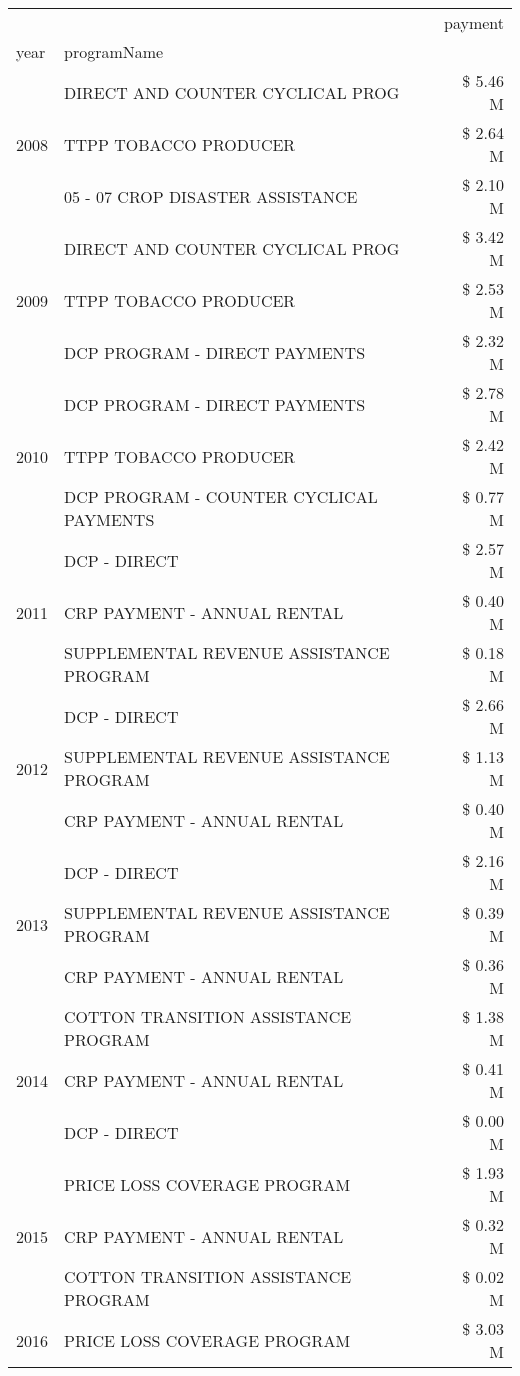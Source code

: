 \begin{tabular}{llr}
\toprule
 &  & payment \\
year & programName &  \\
\midrule
\multirow[t]{3}{*}{2008} & DIRECT AND COUNTER CYCLICAL PROG & \$ 5.46 M \\
 & TTPP TOBACCO PRODUCER & \$ 2.64 M \\
 & 05 - 07 CROP DISASTER ASSISTANCE & \$ 2.10 M \\
\cline{1-3}
\multirow[t]{3}{*}{2009} & DIRECT AND COUNTER CYCLICAL PROG & \$ 3.42 M \\
 & TTPP TOBACCO PRODUCER & \$ 2.53 M \\
 & DCP PROGRAM - DIRECT PAYMENTS & \$ 2.32 M \\
\cline{1-3}
\multirow[t]{3}{*}{2010} & DCP PROGRAM - DIRECT PAYMENTS & \$ 2.78 M \\
 & TTPP TOBACCO PRODUCER & \$ 2.42 M \\
 & DCP PROGRAM - COUNTER CYCLICAL PAYMENTS & \$ 0.77 M \\
\cline{1-3}
\multirow[t]{3}{*}{2011} & DCP - DIRECT & \$ 2.57 M \\
 & CRP PAYMENT - ANNUAL RENTAL & \$ 0.40 M \\
 & SUPPLEMENTAL REVENUE ASSISTANCE PROGRAM & \$ 0.18 M \\
\cline{1-3}
\multirow[t]{3}{*}{2012} & DCP - DIRECT & \$ 2.66 M \\
 & SUPPLEMENTAL REVENUE ASSISTANCE PROGRAM & \$ 1.13 M \\
 & CRP PAYMENT - ANNUAL RENTAL & \$ 0.40 M \\
\cline{1-3}
\multirow[t]{3}{*}{2013} & DCP - DIRECT & \$ 2.16 M \\
 & SUPPLEMENTAL REVENUE ASSISTANCE PROGRAM & \$ 0.39 M \\
 & CRP PAYMENT - ANNUAL RENTAL & \$ 0.36 M \\
\cline{1-3}
\multirow[t]{3}{*}{2014} & COTTON TRANSITION ASSISTANCE PROGRAM & \$ 1.38 M \\
 & CRP PAYMENT - ANNUAL RENTAL & \$ 0.41 M \\
 & DCP - DIRECT & \$ 0.00 M \\
\cline{1-3}
\multirow[t]{3}{*}{2015} & PRICE LOSS COVERAGE PROGRAM & \$ 1.93 M \\
 & CRP PAYMENT - ANNUAL RENTAL & \$ 0.32 M \\
 & COTTON TRANSITION ASSISTANCE PROGRAM & \$ 0.02 M \\
\cline{1-3}
\multirow[t]{3}{*}{2016} & PRICE LOSS COVERAGE PROGRAM & \$ 3.03 M \\

\end{tabular}
